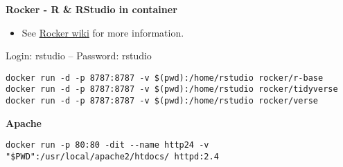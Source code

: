 \documentclass[]{book}
\providecommand{\tightlist}{%
  \setlength{\itemsep}{0pt}\setlength{\parskip}{0pt}}
\theoremstyle{definition}
\theoremstyle{definition}
\theoremstyle{definition}
\theoremstyle{remark}
\begin{document}
\textbf{Rocker - R \& RStudio in container}

\begin{itemize}
\tightlist
\item
  See
  \href{https://github.com/rocker-org/rocker/wiki/Using-the-RStudio-image}{Rocker
  wiki} for more information.
\end{itemize}

Login: rstudio -- Password: rstudio

\begin{verbatim}
docker run -d -p 8787:8787 -v $(pwd):/home/rstudio rocker/r-base
docker run -d -p 8787:8787 -v $(pwd):/home/rstudio rocker/tidyverse
docker run -d -p 8787:8787 -v $(pwd):/home/rstudio rocker/verse
\end{verbatim}

\textbf{Apache}

\begin{verbatim}
docker run -p 80:80 -dit --name http24 -v "$PWD":/usr/local/apache2/htdocs/ httpd:2.4
\end{verbatim}


\end{document}
